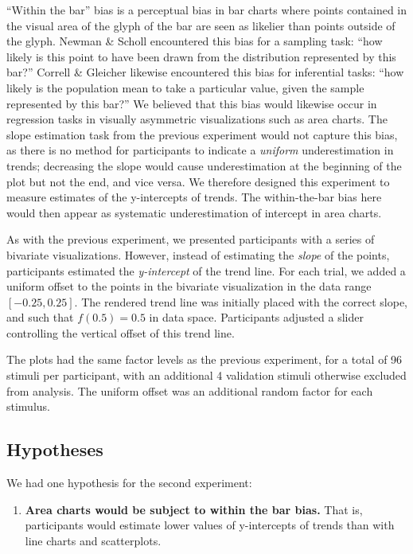 \documentclass{sigchi}
\begin{document}
``Within the bar'' bias is a perceptual bias in bar charts where points contained in the visual area of the glyph of the bar are seen as likelier than points outside of the glyph. Newman \& Scholl \cite{newman2012bar} encountered this bias for a sampling task: ``how likely is this point to have been drawn from the distribution represented by this bar?'' Correll \& Gleicher \cite{correll2014error} likewise encountered this bias for inferential tasks: ``how likely is the population mean to take a particular value, given the sample represented by this bar?'' We believed that this bias would likewise occur in regression tasks in visually asymmetric visualizations such as area charts. The slope estimation task from the previous experiment would not capture this bias, as there is no method for participants to indicate a \emph{uniform} underestimation in trends; decreasing the slope would cause underestimation at the beginning of the plot but not the end, and vice versa. We therefore designed this experiment to measure estimates of the y-intercepts of trends. The within-the-bar bias here would then appear as systematic underestimation of intercept in area charts.

As with the previous experiment, we presented participants with a series of bivariate visualizations. However, instead of estimating the \emph{slope} of the points, participants estimated the \emph{y-intercept} of the trend line. For each trial, we added a uniform offset to the points in the bivariate visualization in the data range $[-0.25,0.25]$. The rendered trend line was initially placed with the correct slope, and such that $f(0.5)=0.5$ in data space. Participants adjusted a slider controlling the vertical offset of this trend line. 

The plots had the same factor levels as the previous experiment, for a total of 96 stimuli per participant, with an additional 4 validation stimuli otherwise excluded from analysis. The uniform offset was an additional random factor for each stimulus. 

\subsection{Hypotheses}

We had one hypothesis for the second experiment:
\begin{enumerate}
	\item \textbf{Area charts would be subject to within the bar bias.} That is, participants would estimate lower values of y-intercepts of trends than with line charts and scatterplots. 
\end{enumerate}
\end{document}
